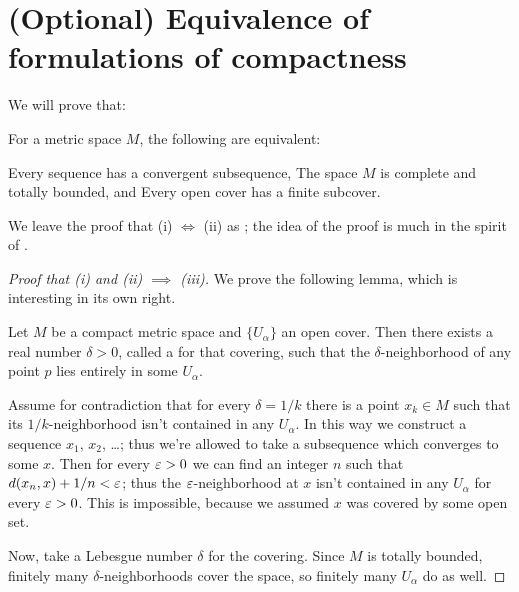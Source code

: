 \section{(Optional) Equivalence of formulations of compactness}
We will prove that:
\begin{theorem}
	For a metric space $M$, the following are equivalent:
	\begin{enumerate}[(i)]
		\ii Every sequence has a convergent subsequence,
		\ii The space $M$ is complete and totally bounded, and
		\ii Every open cover has a finite subcover.
	\end{enumerate}
\end{theorem}
We leave the proof that (i) $\iff$ (ii) as ;
the idea of the proof is much in the spirit of .
\begin{proof}
	[Proof that (i) and (ii) $\implies$ (iii)]
	We prove the following lemma, which is interesting in its own right.
	\begin{lemma}
		Let $M$ be a compact metric space and $\{U_\alpha\}$ an open cover.
		Then there exists a real number $\delta > 0$,
		called a  for that covering,
		such that the $\delta$-neighborhood of any point
		$p$ lies entirely in some $U_\alpha$.
	\end{lemma}
	\begin{subproof}
		Assume for contradiction that for every $\delta = 1/k$
		there is a point $x_k \in M$
		such that its $1/k$-neighborhood isn't contained in any $U_\alpha$.
		In this way we construct a sequence $x_1$, $x_2$, \dots;
		thus we're allowed to take a subsequence which converges to some $x$.
		Then for every $\varepsilon > 0$ we can find an integer $n$ such that $d(x_n, x) + 1/n < \varepsilon$;
		thus the $\varepsilon$-neighborhood at $x$ isn't contained in any $U_\alpha$ for every $\varepsilon > 0$.
		This is impossible, because we assumed $x$ was covered by some open set.
	\end{subproof}
	Now, take a Lebesgue number $\delta$ for the covering.
	Since $M$ is totally bounded, finitely many $\delta$-neighborhoods cover the space,
	so finitely many $U_\alpha$ do as well.
\end{proof}

